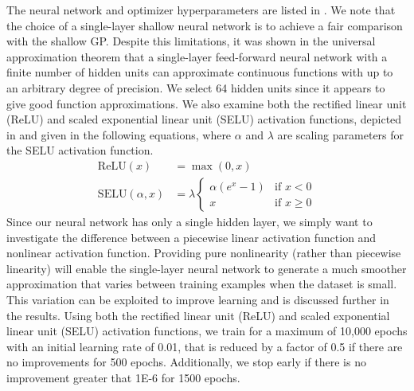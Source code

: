 \documentclass[conference]{IEEEtran}
\begin{document}
	The neural network and optimizer hyperparameters are listed in . We note that the choice of a single-layer shallow neural network is to achieve a fair comparison with the shallow GP. Despite this limitations, it was shown in the universal approximation theorem \cite{Cybenko1989ApproximationFunction} that a single-layer feed-forward neural network with a finite number of hidden units can approximate continuous functions with up to an arbitrary degree of precision. We select 64 hidden units since it appears to give good function approximations. We also examine both the rectified linear unit (ReLU) \cite{Nair2010RectifiedMachines} and scaled exponential linear unit (SELU) \cite{Klambauer2017Self-normalizingNetworks} activation functions, depicted in  and given in the following equations, where $\alpha$ and $\lambda$ are scaling parameters for the SELU activation function.
	\begin{align*}
	    \text{ReLU}(x) &= \max(0, x) \\
	    \text{SELU}(\alpha, x) &= \lambda 
	        \begin{cases}
                \alpha (e^x - 1) & \text{if $x < 0$} \\
                x & \text{if $x \ge 0$}
            \end{cases}   
	\end{align*}
	Since our neural network has only a single hidden layer, we simply want to investigate the difference between a piecewise linear activation function and nonlinear activation function. Providing pure nonlinearity (rather than piecewise linearity) will enable the single-layer neural network to generate a much smoother approximation that varies between training examples when the dataset is small. This variation can be exploited to improve learning and is discussed further in the results. Using both the rectified linear unit (ReLU) and scaled exponential linear unit (SELU) activation functions, we train for a maximum of 10,000 epochs with an initial learning rate of 0.01, that is reduced by a factor of 0.5 if there are no improvements for 500 epochs. Additionally, we stop early if there is no improvement greater that 1E-6 for 1500 epochs.
	
\end{document}
